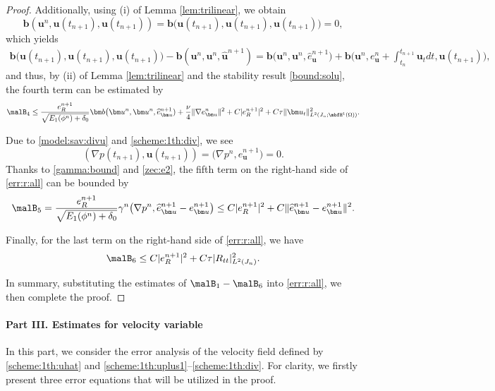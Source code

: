 \begin{proof}
	Additionally, using (i) of Lemma \ref{lem:trilinear}, we obtain 
	$$\bm b( \bm u^n,  \bm u(t_{n+1}), \bm u(t_{n+1}) )= \bm b \big(\bm u(t_{n+1}), \bm u(t_{n+1}), \bm u(t_{n+1}))=0,$$
	which yields
	\begin{equation*}  
		\begin{aligned}
			 \bm b \big(\bm u(t_{n+1}), \bm u(t_{n+1}), \bm u(t_{n+1}))-\bm b(\bm u^n, \bm u^n, \widehat{\bm u}^{n+1}) 
			  =  \bm b \big(\bm u^n, \bm u^n, \widehat{e}_{\bm u}^{n+1})
			+ \bm b\big(\bm u^n, e_{\bm u}^{n}+\int_{t_n}^{t_{n+1}} \bm u_t d t,\bm u(t_{n+1}) \big),
		\end{aligned}
	\end{equation*}
	and thus, by (ii) of Lemma \ref{lem:trilinear} and the stability result \eqref{bound:solu}, the fourth term 
	can be estimated by
	\begin{equation*}
			\malB_4     \le \frac{e_R^{n+1}} {\sqrt{E_1(\phi^n)+\delta_0}} \bm b \big(\bm u^n, \bm u^n, \widehat{e}_{\bm u}^{n+1}) +\frac{\nu}{4}\|\nabla e_{\bm u}^{n}\|^2  + C|e_R^{n+1}|^2 +C\tau\|\bm u_t\|_{L^2(J_n ; \mbfH^1(\Omega))}^2.
	\end{equation*}
	
	Due to \eqref{model:sav:divu} and \eqref{scheme:1th:div}, we see
	\begin{equation}\label{zec:e2}
		(\nabla p(t_{n+1}), \bm u(t_{n+1}))		= \big(\nabla p^n, e_{\bm u}^{n+1}\big)=0.
	\end{equation}
	Thanks to \eqref{gamma:bound} and \eqref{zec:e2}, the fifth term on the right-hand side of \eqref{err:r:all} can be bounded by
	\begin{equation*} 
			\malB_5     = \frac{e_R^{n+1}}  {\sqrt{E_1(\phi^n)+\delta_0}} \gamma^n\big(\nabla p^n, \widehat{e}_{\bm u}^{n+1}-e_{\bm u}^{n+1}\big)
			\le C|e_R^{n+1}|^2 + C\|\widehat{e}_{\bm u}^{n+1}-e_{\bm u}^{n+1}\|^2.
	\end{equation*}
	
	Finally, for the last term on the right-hand side of \eqref{err:r:all}, we have
	\begin{equation*}
		\malB_6 \le C|e_R^{n+1}|^2+C \tau |R_{tt}|_{L^2(J_n)}^2.
	\end{equation*}
	
	In summary, substituting the estimates of $\malB_1-\malB_6$ into  \eqref{err:r:all}, we then complete the proof.
\end{proof}

\paragraph{\bf \indent Part III. Estimates for velocity variable}
In this part, we consider the error analysis of the velocity field defined by \eqref{scheme:1th:uhat} and \eqref{scheme:1th:uplus1}--\eqref{scheme:1th:div}. For clarity, we firstly present three error equations that will be utilized in the proof.

